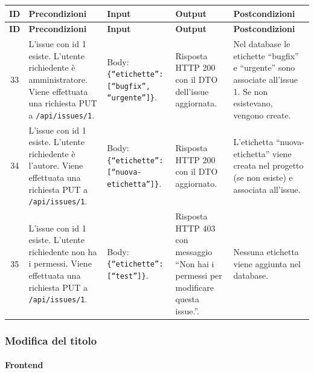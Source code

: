 {
\small
\begin{longtable}{|c|p{3.8cm}|p{3.8cm}|p{3.8cm}|p{3.8cm}|}
\hline
\textbf{ID} & \textbf{Precondizioni} & \textbf{Input} & \textbf{Output} & \textbf{Postcondizioni} \\
\hline
\endfirsthead
\hline
\textbf{ID} & \textbf{Precondizioni} & \textbf{Input} & \textbf{Output} & \textbf{Postcondizioni} \\
\hline
\endhead
33 &
L'issue con id 1 esiste. L'utente richiedente \`e amministratore. Viene effettuata una richiesta PUT a \texttt{/api/issues/1}. &
Body: \texttt{\{``etichette'': [``bugfix'', ``urgente'']\}}. &
Risposta HTTP 200 con il DTO dell'issue aggiornata. &
Nel database le etichette ``bugfix'' e ``urgente'' sono associate all'issue 1. Se non esistevano, vengono create. \\
\hline
34 &
L'issue con id 1 esiste. L'utente richiedente \`e l'autore. Viene effettuata una richiesta PUT a \texttt{/api/issues/1}. &
Body: \texttt{\{``etichette'': [``nuova-etichetta'']\}}. &
Risposta HTTP 200 con il DTO aggiornato. &
L'etichetta ``nuova-etichetta'' viene creata nel progetto (se non esiste) e associata all'issue. \\
\hline
35 &
L'issue con id 1 esiste. L'utente richiedente non ha i permessi. Viene effettuata una richiesta PUT a \texttt{/api/issues/1}. &
Body: \texttt{\{``etichette'': [``test'']\}}. &
Risposta HTTP 403 con messaggio ``Non hai i permessi per modificare questa issue.''. &
Nessuna etichetta viene aggiunta nel database. \\
\hline
\end{longtable}
}

\subsubsection{Modifica del titolo}

\paragraph{Frontend}

